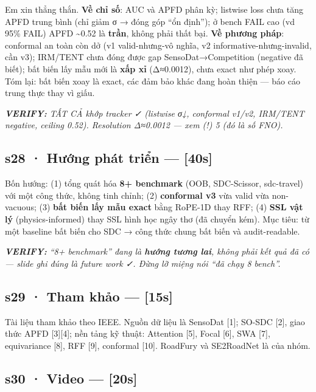 \documentclass[
  11pt,
]{article}
\renewenvironment{quote}
  {\par\smallskip\noindent
   \def\FrameCommand{{\color{deckorange}\vrule width 2.5pt}\hspace{10pt}}%
   \MakeFramed{\advance\hsize-\width\FrameRestore}%
   \footnotesize\itshape\color{deckslate}}
  {\par\endMakeFramed\smallskip}
\begin{document}
Em xin thẳng thắn. \textbf{Về chỉ số}: AUC và APFD phân kỳ; listwise
loss chưa tăng APFD trung bình (chỉ giảm σ → đóng góp ``ổn định''); ở
bench FAIL cao (vd 95\% FAIL) APFD \textasciitilde0.52 là \textbf{trần},
không phải thất bại. \textbf{Về phương pháp}: conformal an toàn còn dở
(v1 valid-nhưng-vô nghĩa, v2 informative-nhưng-invalid, cần v3);
IRM/TENT chưa đóng được gap SensoDat→Competition (negative đã biết); bất
biến lấy mẫu mới là \textbf{xấp xỉ} (Δ≈0.0012), chưa exact như phép
xoay. Tóm lại: bất biến xoay là exact, các đảm bảo khác đang hoàn thiện
--- báo cáo trung thực thay vì giấu.

\begin{quote}
\textbf{VERIFY:} TẤT CẢ khớp tracker ✓ (listwise σ↓, conformal v1/v2,
IRM/TENT negative, ceiling 0.52). Resolution Δ≈0.0012 --- xem (!) 5 (đó
là số FNO).
\end{quote}

\subsection{s28 · Hướng phát triển ---
{[}40s{]}}\label{s28-hux1b0ux1edbng-phuxe1t-triux1ec3n-40s}

Bốn hướng: (1) tổng quát hóa \textbf{8+ benchmark} (OOB, SDC-Scissor,
sdc-travel) với một công thức, không tinh chỉnh; (2) \textbf{conformal
v3} vừa valid vừa non-vacuous; (3) \textbf{bất biến lấy mẫu exact} bằng
RoPE-1D thay RFF; (4) \textbf{SSL vật lý} (physics-informed) thay SSL
hình học ngây thơ (đã chuyển kém). Mục tiêu: từ một baseline bất biến
cho SDC → công thức chung bất biến và audit-readable.

\begin{quote}
\textbf{VERIFY:} ``8+ benchmark'' đang là \textbf{hướng tương lai},
không phải kết quả đã có --- slide ghi đúng là future work ✓. Đừng lỡ
miệng nói ``đã chạy 8 bench''.
\end{quote}

\subsection{s29 · Tham khảo --- {[}15s{]}}\label{s29-tham-khux1ea3o-15s}

Tài liệu tham khảo theo IEEE. Nguồn dữ liệu là SensoDat {[}1{]}; SO-SDC
{[}2{]}, giao thức APFD {[}3{]}{[}4{]}; nền tảng kỹ thuật: Attention
{[}5{]}, Focal {[}6{]}, SWA {[}7{]}, equivariance {[}8{]}, RFF {[}9{]},
conformal {[}10{]}. RoadFury và SE2RoadNet là của nhóm.

\subsection{s30 · Video --- {[}20s{]}}\label{s30-video-20s}
\end{document}
